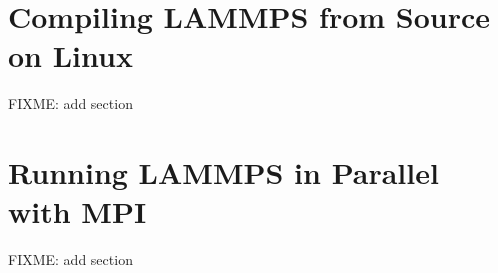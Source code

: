 \documentclass[9pt,tutorial]{livecoms}
\begin{document}
\begin{appendices}
  \section{Compiling LAMMPS from Source on Linux}
  \label{compiling-lammps-label}
  FIXME: add section






  \section{Running LAMMPS in Parallel with MPI}
  \label{parallel-lammps-label}
  FIXME: add section
\end{appendices}
\end{document}
